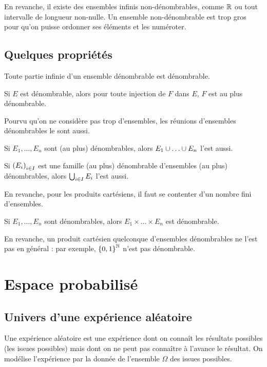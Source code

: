 En revanche, il existe des ensembles infinis non-dénombrables, comme \(\mathbb{R}\) ou tout intervalle de longueur non-nulle. Un ensemble non-dénombrable est trop gros pour qu'on puisse ordonner ses éléments et les numéroter.

\subsection{Quelques propriétés}

\begin{prop}
Toute partie infinie d'un ensemble dénombrable est dénombrable.

Si \(E\) est dénombrable, alors pour toute injection de \(F\) dans \(E\), \(F\) est au plus dénombrable.
\end{prop}

Pourvu qu'on ne considère pas trop d'ensembles, les réunions d'ensembles dénombrables le sont aussi.

\begin{prop}
Si \(E_1,\dots,E_n\) sont (au plus) dénombrables, alors \(E_1\union\dots\union E_n\) l'est aussi.

Si \(\left(E_i\right)_{i\in I}\) est une famille (au plus) dénombrable d'ensembles (au plus) dénombrables, alors \(\bigcup_{i\in I}E_i\) l'est aussi.
\end{prop}

En revanche, pour les produits cartésiens, il faut se contenter d'un nombre fini d'ensembles.

\begin{prop}
Si \(E_1,\dots,E_n\) sont dénombrables, alors \(E_1\times\dots\times E_n\) est dénombrable.
\end{prop}

En revanche, un produit cartésien quelconque d'ensembles dénombrables ne l'est pas en général : par exemple, \(\left\lbrace0,1\right\rbrace^{\mathbb{N}}\) n'est pas dénombrable.

\section{Espace probabilisé}

\subsection{Univers d'une expérience aléatoire}

Une expérience aléatoire est une expérience dont on connaît les résultats possibles (les issues possibles) mais dont on ne peut pas connaître à l'avance le résultat. On modélise l'expérience par la donnée de l'ensemble \(\Omega\) des issues possibles.

